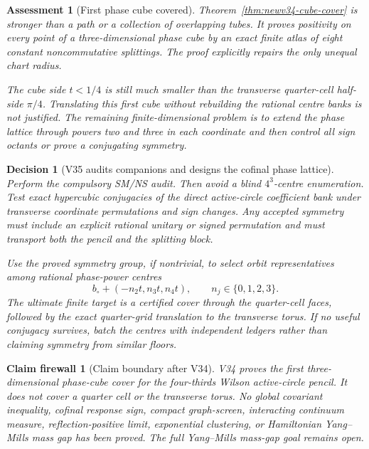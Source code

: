 \documentclass[11pt,oneside]{article}
\newtheorem{assessment}[theorem]{Assessment}
\newtheorem{firewall}[theorem]{Claim firewall}
\newtheorem{decision}[theorem]{Decision}
\theoremstyle{definition}
\theoremstyle{remark}
\begin{document}
\begin{assessment}[First phase cube covered]
\label{ass:newv34}
Theorem~\ref{thm:newv34-cube-cover} is stronger than a path or a
collection of overlapping tubes.  It proves positivity on every
point of a three-dimensional phase cube by an exact finite atlas of
eight constant noncommutative splittings.  The proof explicitly
repairs the only unequal chart radius.

The cube side \(t<1/4\) is still much smaller than the transverse
quarter-cell half-side \(\pi/4\).  Translating this first cube
without rebuilding the rational centre banks is not justified.
The remaining finite-dimensional problem is to extend the phase
lattice through powers two and three in each coordinate and then
control all sign octants or prove a conjugating symmetry.
\end{assessment}

\begin{decision}[V35 audits companions and designs the cofinal phase lattice]
\label{dec:newv34-next}
Perform the compulsory SM/NS audit.  Then avoid a blind
\(4^3\)-centre enumeration.  Test exact hypercubic conjugacies of the
direct active-circle coefficient bank under transverse coordinate
permutations and sign changes.  Any accepted symmetry must include
an explicit rational unitary or signed permutation and must
transport both the pencil and the splitting block.

Use the proved symmetry group, if nontrivial, to select orbit
representatives among rational phase-power centres
\[
 b_\circ+(-n_2t,n_3t,n_4t),\qquad n_j\in\{0,1,2,3\}.
                                                               \tag{34.19}
\]
The ultimate finite target is a certified cover through the
quarter-cell faces, followed by the exact quarter-grid translation
to the transverse torus.  If no useful conjugacy survives, batch the
centres with independent ledgers rather than claiming symmetry from
similar floors.
\end{decision}

\begin{firewall}[Claim boundary after V34]
\label{fire:newv34-final}
V34 proves the first three-dimensional phase-cube cover for the
four-thirds Wilson active-circle pencil.  It does not cover a
quarter cell or the transverse torus.  No global covariant
inequality, cofinal response sign, compact graph-screen, interacting
continuum measure, reflection-positive limit, exponential
clustering, or Hamiltonian Yang--Mills mass gap has been proved.
The full Yang--Mills mass-gap goal remains open.
\end{firewall}
\end{document}
